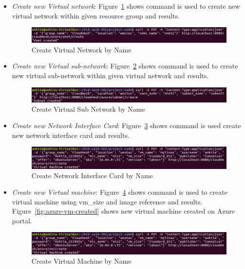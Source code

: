 \begin{itemize}
\item \textit{Create new Virtual network}: Figure~\ref{fig:vnet-create} shows
command is used to create new virtual network within given resource group and
results.

\begin{figure}[!ht]
        \centering\includegraphics[width=\columnwidth]
        {image/vnet-create.PNG}
        \caption{Create Virtual Network by Name}\label{fig:vnet-create}
\end{figure}

\item \textit{Create new Virtual sub-network}: Figure~\ref{fig:subnet-create}
shows command is used to create new virtual sub-network within given virtual
network and results.

\begin{figure}[!ht]
        \centering\includegraphics[width=\columnwidth]
        {image/subnet-create.PNG}
        \caption{Create Virtual Sub Network by Name}\label{fig:subnet-create}
\end{figure}

\item \textit{Create new Network Interface Card}: Figure~\ref{fig:nic-create}
shows command is used create new network interface card and results.

\begin{figure}[!ht]
        \centering\includegraphics[width=\columnwidth]
        {image/nic-create.PNG}
        \caption{Create Network Interface Card by Name}\label{fig:nic-create}
\end{figure}

\item \textit{Create new Virtual machine}: Figure~\ref{fig:vm-create} shows
command is used to create virtual machine using vm\_size and image reference
and results. Figure~\ref{fig:azure-vm-created} shows new virtual machine
created on Azure portal.

\begin{figure}[!ht]
        \centering\includegraphics[width=\columnwidth]
        {image/vm-create.PNG}
        \caption{Create Virtual Machine by Name}\label{fig:vm-create}
\end{figure}


\end{itemize}
